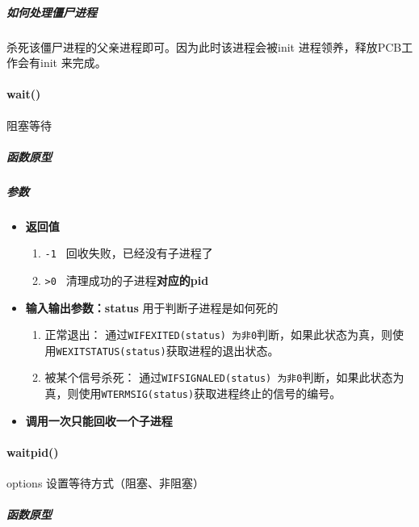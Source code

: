 \documentclass[UTF8,a4paper,12pt]{ctexbook}
\begin{document}
			\subparagraph{如何处理僵尸进程}
				杀死该僵尸进程的父亲进程即可。因为此时该进程会被init 进程领养，释放PCB工作会有init 来完成。
			
		\paragraph{wait()} 阻塞等待
				\subparagraph{函数原型}
				
				\subparagraph{参数}
					\begin{itemize}[itemindent = 1em]
						\item \textbf{返回值}
							\begin{enumerate}[itemindent = 1em]
								\item \verb|-1 | 回收失败，已经没有子进程了
								\item \verb|>0 | 清理成功的子进程\textbf{对应的pid}
							\end{enumerate}						
						\item \textbf{输入输出参数：status} 用于判断子进程是如何死的
							\begin{enumerate}[itemindent = 1em]
								\item 正常退出： 通过\verb|WIFEXITED(status) 为非0|判断，如果此状态为真，则使用\verb|WEXITSTATUS(status)|获取进程的退出状态。
								\item 被某个信号杀死： 通过\verb|WIFSIGNALED(status) 为非0|判断，如果此状态为真，则使用\verb|WTERMSIG(status)|获取进程终止的信号的编号。
							\end{enumerate} 
							
						\item \textbf{调用一次只能回收一个子进程}
					\end{itemize}	
					
							
		\paragraph{waitpid()}options 设置等待方式（阻塞、非阻塞）
				\subparagraph{函数原型}
				
\end{document}
